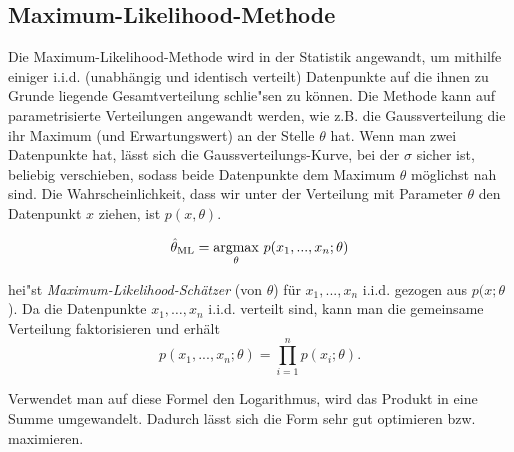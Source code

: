 \subsection{Maximum-Likelihood-Methode}

Die Maximum-Likelihood-Methode wird in der Statistik angewandt, um mithilfe einiger i.i.d. (unabh\"angig und identisch verteilt) Datenpunkte auf die ihnen zu Grunde liegende Gesamtverteilung schlie"sen zu k\"onnen. Die Methode kann auf parametrisierte Verteilungen angewandt werden, wie z.B. die Gaussverteilung die ihr Maximum (und Erwartungswert) an der Stelle $\theta$ hat. Wenn man zwei Datenpunkte hat, l\"asst sich die Gaussverteilungs-Kurve, bei der $\sigma$ sicher ist, beliebig verschieben, sodass beide Datenpunkte dem Maximum $\theta$ m\"oglichst nah sind.
Die Wahrscheinlichkeit, dass wir unter der Verteilung mit Parameter $\theta$ den Datenpunkt $x$ ziehen, ist $p(x,\theta)$. 

\begin{equation*}
\hat{\theta}_{\rm ML} = \underset{\theta}{\operatorname{argmax}} \,\, p (x_{1},...,x_{n};\theta)
\end{equation*}

\noindent hei"st \emph{Maximum-Likelihood-Sch\"atzer} (von $\theta$) für $x_{1},...,x_{n}$ i.i.d. gezogen aus $p(x;\theta$). Da die Datenpunkte $x_1, \dots, x_n$ i.i.d. verteilt sind, kann man die gemeinsame Verteilung faktorisieren und erh\"alt
\begin{equation*}
p (x_{1},...,x_{n};\theta) = \prod_{i=1}^n p(x_i;\theta).
\end{equation*}

Verwendet man auf diese Formel den Logarithmus, wird das Produkt in eine Summe umgewandelt. Dadurch l\"asst sich die Form sehr gut optimieren bzw. maximieren. 


